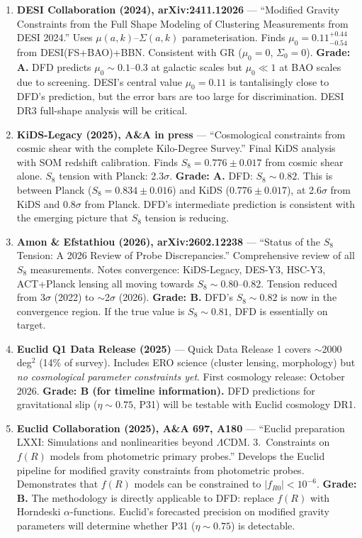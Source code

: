 \documentclass[11pt,a4paper]{article}
\begin{document}
\begin{enumerate}

\item \textbf{DESI Collaboration (2024), arXiv:2411.12026} --- ``Modified Gravity Constraints from the Full Shape Modeling of Clustering Measurements from DESI 2024.'' Uses $\mu(a,k)$--$\Sigma(a,k)$ parameterisation. Finds $\mu_0 = 0.11^{+0.44}_{-0.54}$ from DESI(FS+BAO)+BBN. Consistent with GR ($\mu_0 = 0$, $\Sigma_0 = 0$). \textbf{Grade: A.} DFD predicts $\mu_0 \sim 0.1$--0.3 at galactic scales but $\mu_0 \ll 1$ at BAO scales due to screening. DESI's central value $\mu_0 = 0.11$ is tantalisingly close to DFD's prediction, but the error bars are too large for discrimination. DESI DR3 full-shape analysis will be critical.

\item \textbf{KiDS-Legacy (2025), A\&A in press} --- ``Cosmological constraints from cosmic shear with the complete Kilo-Degree Survey.'' Final KiDS analysis with SOM redshift calibration. Finds $S_8 = 0.776 \pm 0.017$ from cosmic shear alone. $S_8$ tension with Planck: 2.3$\sigma$. \textbf{Grade: A.} DFD: $S_8 \sim 0.82$. This is between Planck ($S_8 = 0.834 \pm 0.016$) and KiDS ($0.776 \pm 0.017$), at 2.6$\sigma$ from KiDS and 0.8$\sigma$ from Planck. DFD's intermediate prediction is consistent with the emerging picture that $S_8$ tension is reducing.

\item \textbf{Amon \& Efstathiou (2026), arXiv:2602.12238} --- ``Status of the $S_8$ Tension: A 2026 Review of Probe Discrepancies.'' Comprehensive review of all $S_8$ measurements. Notes convergence: KiDS-Legacy, DES-Y3, HSC-Y3, ACT+Planck lensing all moving towards $S_8 \sim 0.80$--0.82. Tension reduced from 3$\sigma$ (2022) to $\sim$2$\sigma$ (2026). \textbf{Grade: B.} DFD's $S_8 \sim 0.82$ is now in the convergence region. If the true value is $S_8 \sim 0.81$, DFD is essentially on target.

\item \textbf{Euclid Q1 Data Release (2025)} --- Quick Data Release 1 covers $\sim$2000 deg$^2$ (14\% of survey). Includes ERO science (cluster lensing, morphology) but \emph{no cosmological parameter constraints yet}. First cosmology release: October 2026. \textbf{Grade: B (for timeline information).} DFD predictions for gravitational slip ($\eta \sim 0.75$, P31) will be testable with Euclid cosmology DR1.

\item \textbf{Euclid Collaboration (2025), A\&A 697, A180} --- ``Euclid preparation LXXI: Simulations and nonlinearities beyond $\Lambda$CDM. 3.\ Constraints on $f(R)$ models from photometric primary probes.'' Develops the Euclid pipeline for modified gravity constraints from photometric probes. Demonstrates that $f(R)$ models can be constrained to $|f_{R0}| < 10^{-6}$. \textbf{Grade: B.} The methodology is directly applicable to DFD: replace $f(R)$ with Horndeski $\alpha$-functions. Euclid's forecasted precision on modified gravity parameters will determine whether P31 ($\eta \sim 0.75$) is detectable.

\end{enumerate}
\end{document}
